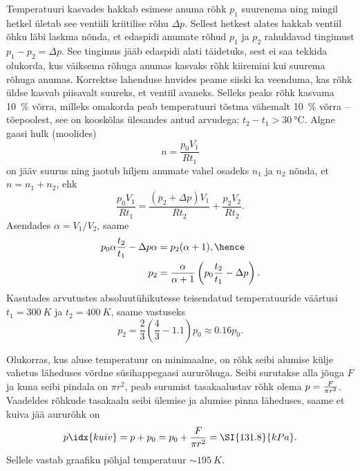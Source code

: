 \documentclass[10pt, twoside]{article}
\begin{document}
{
\solu
Temperatuuri kasvades hakkab esimese anuma rõhk $p_1$ suurenema ning mingil hetkel ületab see ventiili kriitilise rõhu $\Delta p$. Sellest hetkest alates hakkab ventiil õhku läbi laskma nõnda, et edaspidi anumate rõhud $p_1$ ja $p_2$ rahuldavad tingimust $p_1 - p_2 = \Delta p$. See tingimus jääb edaspidi alati täidetuks, sest ei saa tekkida olukorda, kus väiksema rõhuga anumas kasvaks rõhk kiiremini kui suurema rõhuga anumas. Korrektse lahenduse huvides peame siiski ka veenduma, kas rõhk üldse kasvab piisavalt suureks, et ventiil avaneks. Selleks peaks rõhk kasvama \SI{10}{\%} võrra, milleks omakorda peab temperatuuri tõstma vähemalt \SI{10}{\%} võrra – tõepoolest, see on kooskõlas ülesandes antud arvudega: $t_2 - t_1 > \SI{30}{\degreeCelsius}$. Algne gaasi hulk (moolides)
\[
n=\frac{p_{0} V_{1}}{R t_{1}}
\]
on jääv suurus ning jaotub hiljem anumate vahel osadeks $n_1$ ja $n_2$ nõnda, et $n = n_1+ n_2$, ehk
\[
\frac{p_{0} V_{1}}{R t_{1}}=\frac{\left(p_{2}+\Delta p\right) V_{1}}{R t_{2}}+\frac{p_{2} V_{2}}{R t_{2}}.
\]
Asendades $\alpha = V_1/V_2$, saame
\begin{align*}
p_{0} \alpha \frac{t_{2}}{t_{1}}-\Delta p \alpha&=p_{2}(\alpha+1),\hence
\\
p_{2}&=\frac{\alpha}{\alpha+1}\left(p_{0} \frac{t_{2}}{t_{1}}-\Delta p\right).
\end{align*}
Kasutades arvutustes absoluutühikutesse teisendatud temperatuuride väärtusi $t_1= \SI{300}{K}$ ja $t_2= \SI{400}{K}$, saame vastuseks
\[
p_2=\frac 23 \left(\frac 43- \num{1,1}\right) p_0 \approx \num{0,16}p_0.
\]
\probend
\bigskip


\solu
Olukorras, kus aluse temperatuur on minimaalne, on rõhk seibi alumise külje vahetus läheduses võrdne
süsihappegaasi aururõhuga. Seibi surutakse alla jõuga $F$ ja kuna seibi
pindala on $\pi r^2$, peab surumist tasakaalustav rõhk olema $p={F\over \pi r^2}$.
Vaadeldes rõhkude tasakaalu seibi ülemise ja alumise pinna läheduses, saame et kuiva jää aururõhk on
\[
p\idx{kuiv} = p + p_0= p_0+{F\over \pi r^2} = \SI{131.8}{kPa}.
\]
Sellele vastab graafiku põhjal temperatuur $\sim \SI{195}{K}$.
\probend
\bigskip


}
\end{document}
